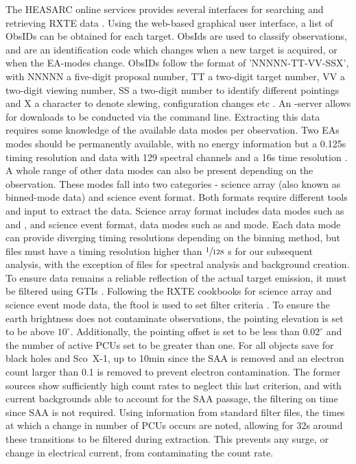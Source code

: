 The \ac{HEASARC} online services provides several interfaces for searching and retrieving \ac{RXTE} data \citep{rxtearchive}. Using the web-based graphical user interface, a list of ObsIDs can be obtained for each target. ObsIds are used to classify observations, and are an identification code which changes when a new target is acquired, or when the \ac{EA}-modes change. ObsIDs follow the format of 'NNNNN-TT-VV-SSX', with NNNNN a five-digit proposal number, TT a two-digit target number, VV a two-digit viewing number, SS a two-digit number to identify different pointings and X a character to denote slewing, configuration changes etc \citep{rxtearchive}. An -server allows for downloads to be conducted via the command line. Extracting this data requires some knowledge of the available data modes per observation. Two \acp{EA} modes should be permanently available,  with no energy information but a 0.125s timing resolution and  data with 129 spectral channels and a 16s time resolution \citep{rxtestdproducts}. A whole range of other data modes can also be present depending on the observation. These modes fall into two categories - science array (also known as binned-mode data) and science event format. Both formats require different tools and input to extract the data. Science array format includes data modes such as  and , and science event format, data modes such as  and  mode. Each data mode can provide diverging timing resolutions depending on the binning method, but files must have a timing resolution higher than $\sfrac{1}{128}\ $s for our subsequent analysis, with the exception of files for spectral analysis and background creation. \\

To ensure data remains a reliable reflection of the actual target emission, it must be filtered using \acp{GTI} \citep{rxtecookbookevent}. Following the \ac{RXTE} cookbooks for science array and science event mode data, the ftool  is used to set filter criteria \citep{maketime,rxtecookbookbinned,rxtecookbookevent}. To ensure the earth brightness does not contaminate observations, the pointing elevation is set to be above $10^\circ$. Additionally, the pointing offset is set to be less than $0.02^\circ$ and the number of active \acp{PCU} set to be greater than one. For all objects save for black holes and Sco~X-1, up to 10min since the \ac{SAA} is removed  and an electron count larger than 0.1 is removed to prevent electron contamination. The former sources show sufficiently high count rates to neglect this last criterion, and with current backgrounds able to account for the \ac{SAA} passage, the filtering on time since \ac{SAA} is not required. Using information from standard filter files, the times at which a change in number of \acp{PCU} occurs are noted, allowing for 32s around these transitions to be filtered during extraction. This prevents any surge, or change in electrical current, from contaminating the count rate. \\

